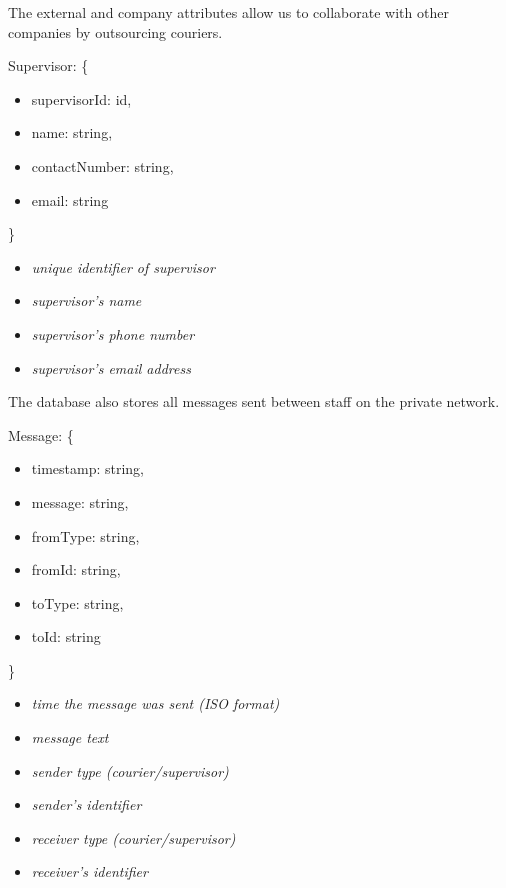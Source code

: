 \begin{flushleft}
The external and company attributes allow us to collaborate with other companies by outsourcing couriers.
\end{flushleft}
\begin{minipage}{6.5cm}
Supervisor: \{
\begin{itemize}
    \itemsep-0.5em
    \item[] supervisorId: id,
    \item[] name: string,
    \item[] contactNumber: string,
    \item[] email: string
\end{itemize}
\}
\end{minipage}
\begin{minipage}{10cm}
\hspace{1cm}
\begin{itemize}
    \itemsep-0.5em
    \item[] \textit{unique identifier of supervisor}
    \item[] \textit{supervisor's name}
    \item[] \textit{supervisor's phone number}
    \item[] \textit{supervisor's email address}
\end{itemize}
\hspace{1cm}
\end{minipage}
\begin{flushleft}
The database also stores all messages sent between staff on the private network.
\end{flushleft}
\begin{minipage}{6.5cm}
Message: \{
\begin{itemize}
    \itemsep-0.5em
    \item[] timestamp: string,
    \item[] message: string,
    \item[] fromType: string,
    \item[] fromId: string,
    \item[] toType: string,
    \item[] toId: string
\end{itemize}
\}
\end{minipage}
\begin{minipage}{10cm}
\hspace{1cm}
\begin{itemize}
    \itemsep-0.5em
    \item[] \textit{time the message was sent (ISO format)}
    \item[] \textit{message text}
    \item[] \textit{sender type (courier/supervisor)}
    \item[] \textit{sender's identifier}
    \item[] \textit{receiver type (courier/supervisor)}
    \item[] \textit{receiver's identifier}
\end{itemize}
\hspace{1cm}
\end{minipage}
